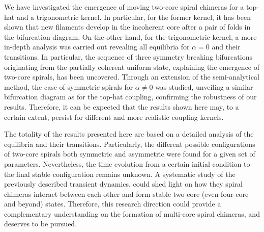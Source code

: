 We have investigated the emergence of moving two-core spiral chimeras for a top-hat
and a trigonometric kernel. In particular, for the former kernel, it has been shown
that new filaments develop in the incoherent core after a pair of folds in the bifurcation diagram.
On the other hand, for the trigonometric kernel, a more in-depth analysis was carried out
revealing all equilibria for $\alpha=0$ and their transitions. In particular, the sequence
of three symmetry breaking bifurcations originating from the partially coherent uniform state, 
explaining the emergence of two-core spirals, has been uncovered. Through an extension of the
semi-analytical method, the case of symmetric spirals for $\alpha \neq 0$ was studied, unveiling a similar
bifurcation diagram as for the top-hat coupling, confirming the robustness of our results.
Therefore, it can be expected that the results shown here may, to a certain extent, persist
for different and more realistic coupling kernels. 

The totality of the results presented here are based on a detailed analysis of the equilibria
and their transitions. Particularly, the different possible configurations of two-core spirals
both symmetric and asymmetric were found for a given set of parameters. Nevertheless,
the time evolution from a certain initial condition to the final stable configuration remains
unknown. A systematic study of the previously described transient dynamics, could shed light on how they spiral
chimeras interact between each other and form stable two-core (even four-core and beyond)
states. Therefore, this research direction could provide a complementary understanding on
the formation of multi-core spiral chimeras, and deserves to be pursued.